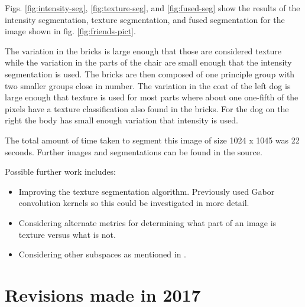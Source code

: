 \documentclass[twocolumn]{article}
\begin{document}
Figs. \ref{fig:intensity-seg}, \ref{fig:texture-seg}, and \ref{fig:fused-seg}
show the results of the intensity segmentation,
texture segmentation, and fused segmentation for the image shown in
fig. \ref{fig:friends-pict}.

The variation in the bricks is large enough that those are considered texture
while the variation in the parts of the chair are small enough that the
intensity segmentation is used. The bricks are then composed of one principle
group with two smaller groups close in number. The variation in the coat of
the left dog is large enough that texture is used for most parts where about 
one one-fifth of the pixels have a texture classification also found in the
bricks. For the dog on the right the body has small enough variation that
intensity is used. 


The total amount of time taken to 
segment this image of size 1024 x 1045 was 22 seconds. Further images and 
segmentations can be found in the source.

Possible further work includes: 
\begin{itemize}

\item Improving the texture segmentation algorithm. Previously
\cite{prev} used Gabor convolution kernels \cite{gabor} so this could be
investigated in more detail. 

\item Considering alternate metrics for determining what part of
an image is texture versus what is not. 

\item Considering other subspaces as mentioned in \cite{prev}.

\end{itemize}

\section{Revisions made in 2017}
\end{document}
